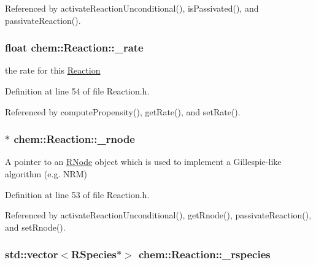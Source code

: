 Referenced by activate\-Reaction\-Unconditional(), is\-Passivated(), and passivate\-Reaction().

\hypertarget{classchem_1_1Reaction_a6c5cd99c16816bfcbee48b8c78a0efe5}{
\subsubsection[{\-\_\-rate}]{\setlength{\rightskip}{0pt plus 5cm}float {\bf chem\-::\-Reaction\-::\-\_\-rate}}}\label{classchem_1_1Reaction_a6c5cd99c16816bfcbee48b8c78a0efe5}


the rate for this \hyperlink{classchem_1_1Reaction}{Reaction} 



Definition at line 54 of file Reaction.\-h.



Referenced by compute\-Propensity(), get\-Rate(), and set\-Rate().

\hypertarget{classchem_1_1Reaction_ae10d6d1a25e37bc4b3b5df478094e745}{
\subsubsection[{\-\_\-rnode}]{$\ast$ {\bf chem\-::\-Reaction\-::\-\_\-rnode}}}\label{classchem_1_1Reaction_ae10d6d1a25e37bc4b3b5df478094e745}


A pointer to an \hyperlink{classchem_1_1RNode}{R\-Node} object which is used to implement a Gillespie-\/like algorithm (e.\-g. N\-R\-M) 



Definition at line 53 of file Reaction.\-h.



Referenced by activate\-Reaction\-Unconditional(), get\-Rnode(), passivate\-Reaction(), and set\-Rnode().

\hypertarget{classchem_1_1Reaction_a5a8f536126edeb82526f9ac31c3e3c6c}{
\subsubsection[{\-\_\-rspecies}]{\setlength{\rightskip}{0pt plus 5cm}std\-::vector$<${\bf R\-Species}$\ast$$>$ {\bf chem\-::\-Reaction\-::\-\_\-rspecies}}}\label{classchem_1_1Reaction_a5a8f536126edeb82526f9ac31c3e3c6c}


